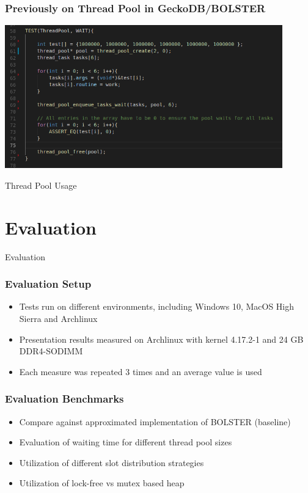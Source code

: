 \documentclass{beamer}
\begin{document}
\begin{frame}
	\frametitle{Previously on Thread Pool in GeckoDB/BOLSTER}
	\begin{center}
		\includegraphics[width=0.9\textwidth]{img/thread_pool_use.png}
		
	\end{center}
	\begin{center}
		Thread Pool Usage
	\end{center}
\end{frame}

\section{Evaluation}
\begin{frame}
	\begin{center}
		\huge Evaluation
	\end{center}
\end{frame}

\begin{frame}
	\frametitle{Evaluation Setup}
	\begin{itemize}
		\item Tests run on different environments, including Windows 10, MacOS High Sierra and Archlinux
		\item Presentation results measured on Archlinux with kernel 4.17.2-1 and 24 GB DDR4-SODIMM
		\item Each measure was repeated 3 times and an average value is used
	\end{itemize}
\end{frame}

\begin{frame}
	\frametitle{Evaluation Benchmarks}
	\begin{itemize}
		\item Compare against approximated implementation of BOLSTER (baseline)
		\item Evaluation of waiting time for different thread pool sizes
		\item Utilization of different slot distribution strategies
		\item Utilization of lock-free vs mutex based heap
	\end{itemize}
\end{frame}
\end{document}
